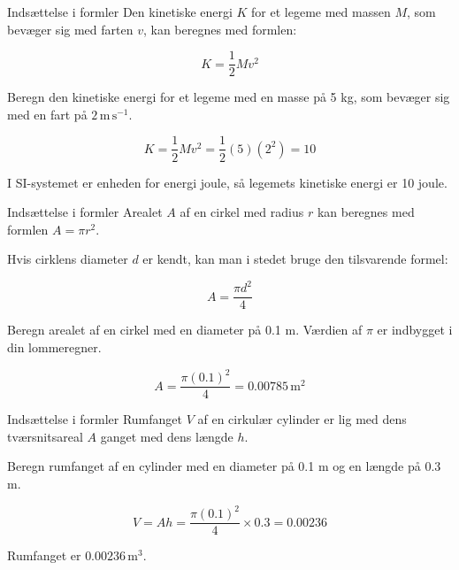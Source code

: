 \begin{example} Indsættelse i formler \newline
Den kinetiske energi \(K\) for et legeme med massen \(M\), som bevæger sig med farten \(v\), kan beregnes med formlen:

\[
K = \frac{1}{2}Mv^2
\]

Beregn den kinetiske energi for et legeme med en masse på 5 kg, som bevæger sig med en fart på \(2 \, \text{m} \, \text{s}^{-1}\).

\begin{solution}
\[
K = \frac{1}{2}Mv^2 = \frac{1}{2}(5)(2^2) = 10
\] 

\end{solution}

I SI-systemet er enheden for energi joule, så legemets kinetiske energi er 10 joule.
\end{example}

\begin{example} Indsættelse i formler \newline
Arealet \(A\) af en cirkel med radius \(r\) kan beregnes med formlen \(A = \pi r^2\).

Hvis cirklens diameter \(d\) er kendt, kan man i stedet bruge den tilsvarende formel:

\[
A = \frac{\pi d^2}{4}
\]

Beregn arealet af en cirkel med en diameter på 0.1 m. Værdien af \(\pi\) er indbygget i din lommeregner.

\begin{solution}
    \[
A = \frac{\pi (0.1)^2}{4} = 0.00785 \, \text{m}^2
\]

\end{solution}


\end{example}

\begin{example} Indsættelse i formler \newline
Rumfanget \(V\) af en cirkulær cylinder er lig med dens tværsnitsareal \(A\) ganget med dens længde \(h\).

Beregn rumfanget af en cylinder med en diameter på 0.1 m og en længde på 0.3 m.

\begin{solution}
  \[
V = Ah = \frac{\pi (0.1)^2}{4} \times 0.3 = 0.00236
\]

Rumfanget er \(0.00236 \, \text{m}^3\).
\end{solution}
\end{example}

